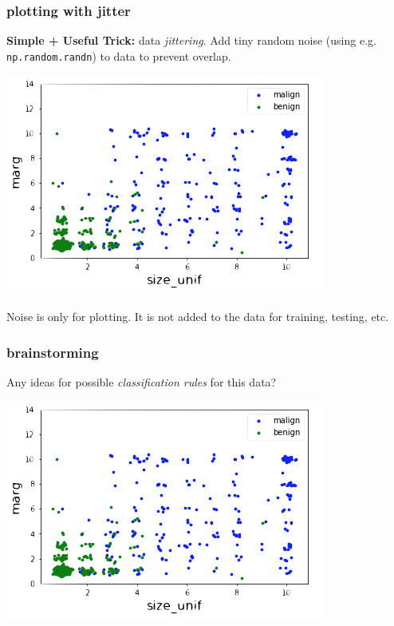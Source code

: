 \documentclass[handout,compress]{beamer}
\begin{document}
\begin{frame}
	\frametitle{plotting with jitter}
	\textbf{Simple + Useful Trick:} data \emph{jittering}. Add tiny random noise (using e.g. \texttt{np.random.randn}) to data to prevent overlap. 
	\begin{center}
		\includegraphics[width=.7\textwidth]{jittered.png}
		
		Noise is only for plotting. It is not added to the data for training, testing, etc. 
	\end{center}
\end{frame}

\begin{frame}
	\frametitle{brainstorming}
	\begin{center}
		Any ideas for possible \emph{classification rules} for this data?
		
		\includegraphics[width=.7\textwidth]{jittered.png}
		
	\end{center}
\end{frame}
\end{document}
